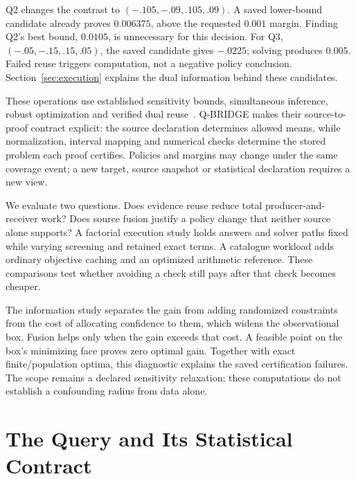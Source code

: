 \documentclass[conference]{IEEEtran}
\begin{document}
Q2 changes the contrast to $(-.105,-.09,.105,.09)$. A saved lower-bound candidate already proves $0.006375$, above the requested $0.001$ margin. Finding Q2's best bound, $0.0105$, is unnecessary for this decision. For Q3, $(-.05,-.15,.15,.05)$, the saved candidate gives $-.0225$; solving produces $0.005$. Failed reuse triggers computation, not a negative policy conclusion. Section~\ref{sec:execution} explains the dual information behind these candidates.

These operations use established sensitivity bounds, simultaneous inference, robust optimization and verified dual reuse~\cite{dorn2025dvds,ishikawa2026convex,Berk2013PoSI,Bertsimas2018DataRobust,Neumaier2004SafeBounds,Marcucci2021WarmStart}. Q-BRIDGE makes their source-to-proof contract explicit: the source declaration determines allowed means, while normalization, interval mapping and numerical checks determine the stored problem each proof certifies. Policies and margins may change under the same coverage event; a new target, source snapshot or statistical declaration requires a new view.

We evaluate two questions. Does evidence reuse reduce total producer-and-receiver work? Does source fusion justify a policy change that neither source alone supports? A factorial execution study holds answers and solver paths fixed while varying screening and retained exact terms. A catalogue workload adds ordinary objective caching and an optimized arithmetic reference. These comparisons test whether avoiding a check still pays after that check becomes cheaper.

The information study separates the gain from adding randomized constraints from the cost of allocating confidence to them, which widens the observational box. Fusion helps only when the gain exceeds that cost. A feasible point on the box's minimizing face proves zero optimal gain. Together with exact finite/population optima, this diagnostic explains the saved certification failures. The scope remains a declared sensitivity relaxation; these computations do not establish a confounding radius from data alone.

\section{The Query and Its Statistical Contract}\label{sec:contract}
\end{document}
